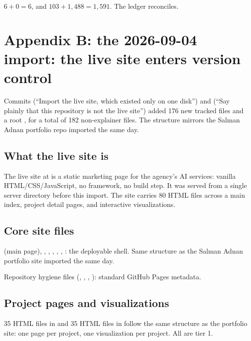 \documentclass[11pt,a4paper]{article}
\begin{document}
$6 + 0 = 6$, and $103 + 1{,}488 = 1{,}591$. The ledger reconciles.


\section{Appendix B: the 2026-09-04 import: the live site enters version control}

Commits  (``Import the live site, which existed only on one
disk'') and  (``Say plainly that this repository is not the live
site'') added 176 new tracked files and a root , for a total
of 182 non-explainer files. The structure mirrors the Salman Adnan portfolio
repo imported the same day.

\subsection*{What the live site is}

The live site at  is a static marketing page for the
agency's AI services: vanilla HTML/CSS/JavaScript, no framework, no build step.
It was served from a single server directory before this import. The site
carries 80 HTML files across a main index, project detail pages, and interactive
visualizations.

\subsection*{Core site files}

 (main page), ,
, ,
, ,
: the deployable shell. Same structure as the
Salman Adnan portfolio site imported the same day.

Repository hygiene files (,
, ,
): standard GitHub Pages metadata.

\subsection*{Project pages and visualizations}

35 HTML files in  and 35 HTML files in
 follow the same structure as the portfolio site:
one page per project, one visualization per project. All are tier 1.
\end{document}
